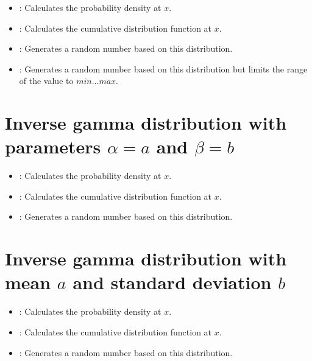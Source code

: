 \begin{itemize}

\item
{}:
Calculates the probability density at $x$.

\item
{}:
Calculates the cumulative distribution function at $x$.

\item
{}:
Generates a random number based on this distribution.

\item
{}:
Generates a random number based on this distribution but limits the range of the value to $min\ldots max$.

\end{itemize}



\section{Inverse gamma distribution with parameters \texorpdfstring{$\alpha=a$}{a} and \texorpdfstring{$\beta=b$}{b}}

\begin{itemize}

\item
{}:
Calculates the probability density at $x$.

\item
{}:
Calculates the cumulative distribution function at $x$.

\item
{}:
Generates a random number based on this distribution.

\end{itemize}



\section{Inverse gamma distribution with mean \texorpdfstring{$a$}{a} and standard deviation \texorpdfstring{$b$}{b}}

\begin{itemize}

\item
{}:
Calculates the probability density at $x$.

\item
{}:
Calculates the cumulative distribution function at $x$.

\item
{}:
Generates a random number based on this distribution.

\end{itemize}



